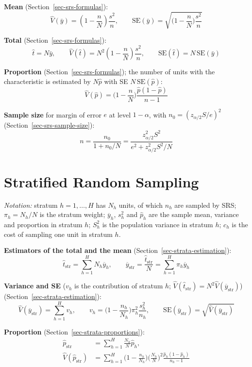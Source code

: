 \documentclass[
  letterpaper,
  DIV=11,
  numbers=noendperiod]{scrreprt}
\renewcommand{\[}{\begin{equation}}
\renewcommand{\]}{\end{equation}}
\begin{document}
\textbf{Mean} (Section~\ref{sec-srs-formulas}): \[
\boxed{
\hat{V}(\bar{y}) = \left(1 - \frac{n}{N}\right)\frac{s^2}{n}, \qquad
\mathrm{SE}(\bar y) = \sqrt{\Big(1-\frac nN\Big)\frac{s^2}{n}}}
\]

\textbf{Total} (Section~\ref{sec-srs-formulas}): \[
\boxed{
\hat{t} = N\bar{y}, \qquad
\hat{V}(\hat{t}) = N^2\left(1 - \frac{n}{N}\right)\frac{s^2}{n}, \qquad
\mathrm{SE}(\hat{t}) = N\,\mathrm{SE}(\bar{y})}
\]

\textbf{Proportion} (Section~\ref{sec-srs-formulas}); the number of
units with the characteristic is estimated by \(N\hat p\) with SE
\(N\,\mathrm{SE}(\hat p)\): \[
\boxed{\hat V(\hat p) = \Big(1-\frac nN\Big)\frac{\hat p (1-\hat p)}{n-1}}
\]

\textbf{Sample size} for margin of error \(e\) at level \(1-\alpha\),
with \(n_0 = (z_{\alpha/2}S/e)^2\) (Section~\ref{sec-srs-sample-size}):
\[
\boxed{n = \frac{n_0}{1+n_0/N} = \frac{z_{\alpha/2}^2 S^2}{e^2 + z_{\alpha/2}^2 S^2/N}}
\]

\section{Stratified Random Sampling}\label{stratified-random-sampling-1}

\emph{Notation:} stratum \(h = 1,\ldots,H\) has \(N_h\) units, of which
\(n_h\) are sampled by SRS; \(\pi_h = N_h/N\) is the stratum weight;
\(\overline y_h\), \(s_h^2\) and \(\hat p_h\) are the sample mean,
variance and proportion in stratum \(h\); \(S_h^2\) is the population
variance in stratum \(h\); \(c_h\) is the cost of sampling one unit in
stratum \(h\).

\textbf{Estimators of the total and the mean}
(Section~\ref{sec-strata-estimation}): \[
\boxed{
\hat t_{\text{str}} = \sum_{h=1}^H N_h \overline y_h,
\qquad
\overline y_{\text{str}} = \frac{\hat t_{\text{str}}}{N} = \sum_{h=1}^H \pi_h\overline y_h}
\]

\textbf{Variance and SE} (\(v_h\) is the contribution of stratum \(h\);
\(\hat V(\hat t_{\text{str}}) = N^2\hat V(\overline y_{\text{str}})\))
(Section~\ref{sec-strata-estimation}): \[
\boxed{
\hat V(\overline y_{\text{str}}) = \sum_{h=1}^H v_h, \qquad
v_h = \Big(1-\frac{n_h}{N_h}\Big)\pi_h^2\frac{s_h^2}{n_h}, \qquad
\mathrm{SE}(\overline y_{\text{str}}) = \sqrt{\hat V(\overline y_{\text{str}})}}
\]

\textbf{Proportion} (Section~\ref{sec-strata-proportions}): \[
\boxed{\begin{aligned}
\hat p_{\text{str}} &= \sum_{h=1}^H \frac{N_h}{N}\hat p_h, \\
\hat V(\hat p_{\text{str}}) &= \sum_{h=1}^H \Big(1-\frac{n_h}{N_h}\Big)\Big(\frac{N_h}{N}\Big)^2\frac{\hat p_h(1-\hat p_h)}{n_h-1}
\end{aligned}}
\]
\end{document}

